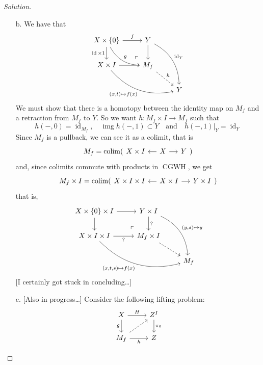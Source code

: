 \documentclass{article}
\numberwithin{equation}{section}
\DeclareMathOperator{\img}{img}
\DeclareMathOperator{\id}{id}
\DeclareMathOperator{\CGWH}{CGWH}
\DeclareMathOperator{\colim}{colim}
\begin{document}
\begin{proof}[Solution]\leavevmode
	\begin{enumerate}
		\item[b.] We have that
		\[\begin{tikzcd}
			X\times\{0\}\arrow[r,"f"]\arrow[d,swap,"\id\times 1"]\arrow[rd,bend right,"g"]&Y\arrow[d]\arrow[ddr,bend left,"\id_Y"]\\
			X\times I\arrow[r,swap]\arrow[drr,bend right,swap,"(x\text{,}t)\mapsto f(x)"]&M_f\arrow[ul, phantom, "\ulcorner", very near start]\arrow[dr,dashed,"h"]\\
			&&Y
		\end{tikzcd}\]
		We must show that there is a homotopy between the identity map on $M_f$ and a retraction from $M_f$ to $Y$. So we want $h:M_f\times I\to M_f$ such that
		\[h(-,0)=\id_{M_f},\quad \img h(-,1)\subset Y\quad\text{and}\quad h(-,1)|_Y=\id_Y\]
		Since $M_f$ is a pullback, we can see it as a colimit, that is
		\[M_f=\colim(\begin{tikzcd}[column sep=small]
			X\times I&\arrow[l]X\arrow[r]&Y
		\end{tikzcd})\]
		and, since colimits commute with products in $\CGWH$, we get
		\[M_f\times I=\colim(\begin{tikzcd}[column sep=small]
			X\times I\times I&\arrow[l]X\times I\arrow[r]&Y\times I
		\end{tikzcd})\]
		that is,
		\[\begin{tikzcd}
			X\times\{0\}\times I\arrow[r]\arrow[d]&Y\times I\arrow[d,"?"]\arrow[ddr,bend left,"(y\text{,}s)\mapsto y"]\\
			X\times I\times I\arrow[r,"?",swap]\arrow[drr,bend right,"(x\text{,}t\text{,}s)\mapsto f(x)",swap]&M_f\times I\arrow[ul, phantom, "\ulcorner", very near start]\arrow[dr,dashed]\\
			&&M_f
		\end{tikzcd}\]
		{\color{red}[I certainly got stuck in concluding…]}
		
		\item[c.] {\color{red}[Also in progress…]} Consider the following lifting problem:
		\[\begin{tikzcd}
			X\arrow[d,"g",swap]\arrow[r,"H"]&Z^I\arrow[d,"\pi_0"]\\
			M_f\arrow[ur,dashed]\arrow[r,"h",swap]&Z
		\end{tikzcd}\]
	\end{enumerate}
\end{proof}
\end{document}
